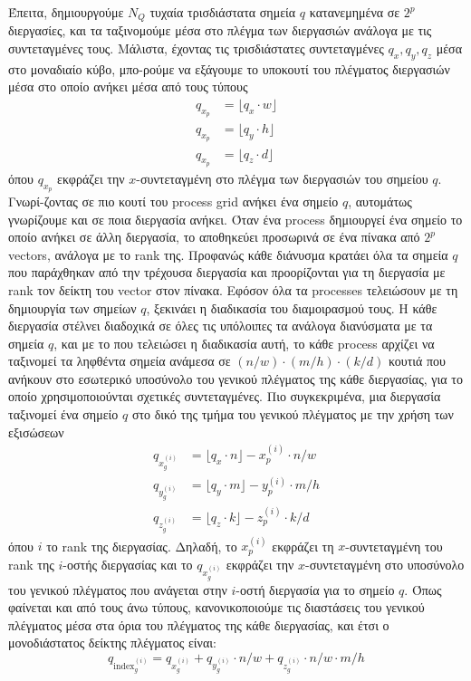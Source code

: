 \documentclass[11pt,a4paper,titlepage]{article}
\begin{document}
 	Έπειτα, δημιουργούμε $N_Q$ τυχαία τρισδιάστατα σημεία $q$ κατανεμημένα σε $2^p$ διεργασίες, και τα ταξινομούμε μέσα στο πλέγμα των διεργασιών ανάλογα με τις συντεταγμένες τους. Μάλιστα, έχοντας τις τρισδιάστατες συντεταγμένες $q_x, q_y, q_z$ μέσα στο μοναδιαίο κύβο, μπο-ρούμε να εξάγουμε το υποκουτί του πλέγματος διεργασιών μέσα στο οποίο ανήκει μέσα από τους τύπους
 	\begin{align}
	 	q_{x_p} &= \lfloor q_x \cdot w \rfloor\\
	 	q_{x_p} &= \lfloor q_y \cdot h \rfloor\\
	 	q_{x_p} &= \lfloor q_z \cdot d \rfloor
 	\end{align}
 	όπου $q_{x_p}$ εκφράζει την $x$-συντεταγμένη στο πλέγμα των διεργασιών του σημείου $q$. Γνωρί-ζοντας σε πιο κουτί του process grid ανήκει ένα σημείο $q$, αυτομάτως γνωρίζουμε και σε ποια διεργασία ανήκει. Όταν ένα process δημιουργεί ένα σημείο το οποίο ανήκει σε άλλη διεργασία, το αποθηκεύει προσωρινά σε ένα πίνακα από $2^p$ vectors, ανάλογα με το rank της. Προφανώς κάθε διάνυσμα κρατάει όλα τα σημεία $q$ που παράχθηκαν από την τρέχουσα διεργασία και προορίζονται για τη διεργασία με rank τον δείκτη του vector στον πίνακα. Εφόσον όλα τα processes τελειώσουν με τη δημιουργία των σημείων $q$, ξεκινάει η διαδικασία του διαμοιρασμού τους. Η κάθε διεργασία στέλνει διαδοχικά σε όλες τις υπόλοιπες τα ανάλογα διανύσματα με τα σημεία $q$, και με το που τελειώσει η διαδικασία αυτή, το κάθε process αρχίζει να ταξινομεί τα ληφθέντα σημεία ανάμεσα σε $(n/w)\cdot (m/h)\cdot (k/d)$ κουτιά που ανήκουν στο εσωτερικό υποσύνολο του γενικού πλέγματος της κάθε διεργασίας, για το οποίο χρησιμοποιούνται σχετικές συντεταγμένες. Πιο συγκεκριμένα, μια διεργασία ταξινομεί ένα σημείο $q$ στο δικό της τμήμα του γενικού πλέγματος με την χρήση των εξισώσεων
 	\begin{align}
	 	q_{x_g^{(i)}} &= \lfloor q_x \cdot n \rfloor -  {x_p^{(i)}}\cdot n/w \label{eq:12}\\
	 	q_{y_g^{(i)}} &= \lfloor q_y \cdot m \rfloor -  {y_p^{(i)}}\cdot m/h \label{eq:13}\\
	 	q_{z_g^{(i)}} &= \lfloor q_z \cdot k \rfloor -  {z_p^{(i)}}\cdot k/d \label{eq:14}
 	\end{align}
 	όπου $i$ το rank της διεργασίας. Δηλαδή, το ${x_p^{(i)}}$ εκφράζει τη $x$-συντεταγμένη του rank της $i$-οστής διεργασίας και το $q_{x_g^{(i)}}$ εκφράζει την $x$-συντεταγμένη στο υποσύνολο του γενικού πλέγματος που ανάγεται στην $i$-οστή διεργασία για το σημείο $q$. Όπως φαίνεται και από τους άνω τύπους, κανονικοποιούμε τις διαστάσεις του γενικού πλέγματος μέσα στα όρια του πλέγματος της κάθε διεργασίας, και έτσι ο μονοδιάστατος δείκτης πλέγματος είναι:
	\begin{equation}
	 	q_{\mathrm{index}_g^{(i)}} = q_{x_g^{(i)}} + q_{y_g^{(i)}} \cdot n/w + q_{z_g^{(i)}}\cdot n/w \cdot m/h 
	\end{equation}\\[-2em]
 	
\end{document}
